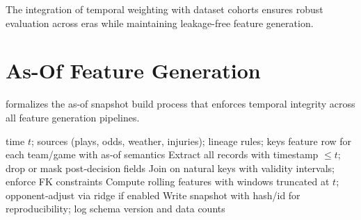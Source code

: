 The integration of temporal weighting with dataset cohorts ensures robust evaluation across eras while maintaining leakage-free feature generation.

\section{As-Of Feature Generation}
\label{sec:asof-generation}

 formalizes the as-of snapshot build process that enforces temporal integrity across all feature generation pipelines.

\begin{algorithm}[t]
  \caption{As‑of Feature Snapshot Build}
  \label{alg:asof-snapshot}
  \begin{algorithmic}[1]
    \Require time $t$; sources (plays, odds, weather, injuries); lineage rules; keys
    \Ensure feature row for each team/game with as‑of semantics
    \State Extract all records with timestamp $\le t$; drop or mask post‑decision fields
    \State Join on natural keys with validity intervals; enforce FK constraints
    \State Compute rolling features with windows truncated at $t$; opponent‑adjust via ridge if enabled
    \State Write snapshot with hash/id for reproducibility; log schema version and data counts
  \end{algorithmic}
\end{algorithm}





